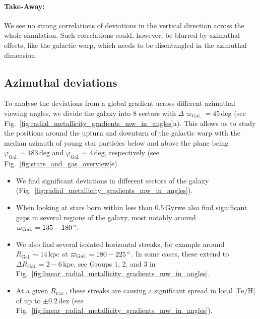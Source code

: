 \documentclass[fleqn,usenatbib]{mnras}
\newcommand{\SB}[1]{{\textcolor{purple}{SB: #1}}}
\newcommand{\nihaoAGEmax}{$0.5\,\mathrm{Gyr}$}
\begin{document}
\paragraph*{Take-Away:} We see no strong correlations of deviations in the vertical direction across the whole simulation. Such correlations could, however, be blurred by azimuthal effects, like the galactic warp, which needs to be disentangled in the azimuthal dimension.

\subsection{Azimuthal deviations}
\label{sec:coherence_azimuth_radial_metallicity_gradients}

To analyse the deviations from a global gradient across different azimuthal viewing angles, we divide the galaxy into 8 sectors with $\Delta \varpi_\mathrm{Gal.} = 45\,\mathrm{deg}$ (see Fig.~\ref{fig:radial_metallicity_gradients_mw_in_angles}a). This allows us to study the positions around the upturn and downturn of the galactic warp with the median azimuth of young star particles below and above the plane being $\varphi_\mathrm{Gal.} \sim 183\,\mathrm{deg}$ and $\varphi_\mathrm{Gal.} \sim 4\,\mathrm{deg}$, respectively (see Fig.~\ref{fig:stars_and_gas_overview}e).

\begin{itemize}
    \item We find significant deviations in different sectors of the galaxy (Fig.~\ref{fig:radial_metallicity_gradients_mw_in_angles}).
    \item When looking at stars born within less than \nihaoAGEmax we also find significant gaps in several regions of the galaxy, most notably around $\varpi_\mathrm{Gal.} = 135-180\,\mathrm{\degree}$.
    \item We also find several isolated horizontal streaks, for example around $R_\mathrm{Gal.} \sim 14\,\mathrm{kpc}$ at $\varpi_\mathrm{Gal.} = 180-225\,\mathrm{\degree}$. In some cases, these extend to $\Delta R_\mathrm{Gal.} = 2-6\,\mathrm{kpc}$, see Groups 1, 2, and 3 in Fig.~\ref{fig:linear_radial_metallicity_gradients_mw_in_angles}.
    \item At a given $R_\mathrm{Gal.}$, these streaks are causing a significant spread in local [Fe/H] of up to $\pm 0.2\,\mathrm{dex}$ (see Fig.~\ref{fig:linear_radial_metallicity_gradients_mw_in_angles}).
\end{itemize}

\end{document}
